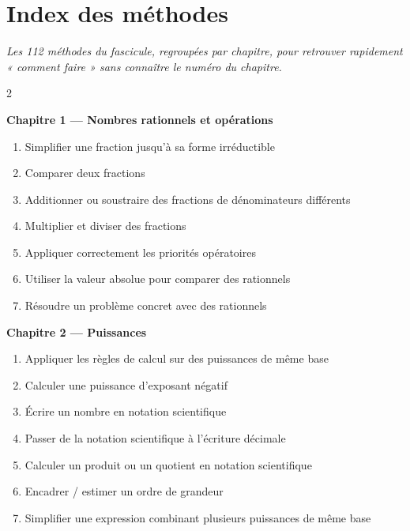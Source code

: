\chapter{Index des méthodes}

\noindent\textit{Les 112 méthodes du fascicule, regroupées par chapitre, pour retrouver
rapidement « comment faire » sans connaître le numéro du chapitre.}
\vspace{8pt}

\begin{multicols}{2}
\footnotesize

\textbf{\normalsize\color{onbo}Chapitre 1 --- Nombres rationnels et opérations}
\begin{enumerate}[label=\arabic*.,itemsep=1pt,topsep=2pt,leftmargin=1.6em]
\item Simplifier une fraction jusqu'à sa forme irréductible
\item Comparer deux fractions
\item Additionner ou soustraire des fractions de dénominateurs différents
\item Multiplier et diviser des fractions
\item Appliquer correctement les priorités opératoires
\item Utiliser la valeur absolue pour comparer des rationnels
\item Résoudre un problème concret avec des rationnels
\end{enumerate}
\vspace{4pt}

\textbf{\normalsize\color{onbo}Chapitre 2 --- Puissances}
\begin{enumerate}[label=\arabic*.,itemsep=1pt,topsep=2pt,leftmargin=1.6em]
\item Appliquer les règles de calcul sur des puissances de même base
\item Calculer une puissance d'exposant négatif
\item Écrire un nombre en notation scientifique
\item Passer de la notation scientifique à l'écriture décimale
\item Calculer un produit ou un quotient en notation scientifique
\item Encadrer / estimer un ordre de grandeur
\item Simplifier une expression combinant plusieurs puissances de même base
\end{enumerate}
\vspace{4pt}


\end{multicols}
